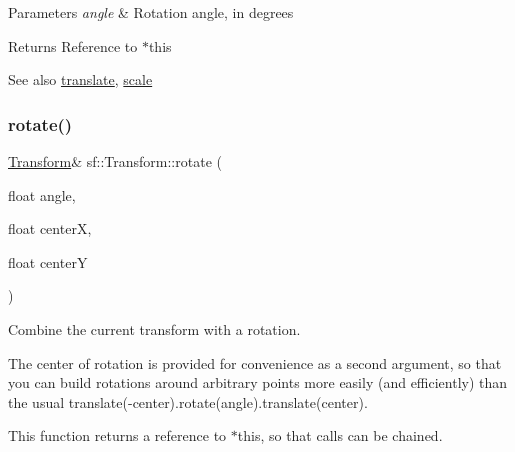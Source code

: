 \begin{DoxyParams}{Parameters}
{\em angle} & Rotation angle, in degrees\\
\hline
\end{DoxyParams}
\begin{DoxyReturn}{Returns}
Reference to $\ast$this
\end{DoxyReturn}
\begin{DoxySeeAlso}{See also}
\mbox{\hyperlink{classsf_1_1_transform_ab54f6c8070cc05e2afcb3145fbf4395a}{translate}}, \mbox{\hyperlink{classsf_1_1_transform_a3f46af807f69d74120fb836334268671}{scale}} \begin{DoxyVerb}\end{DoxyVerb}
 
\end{DoxySeeAlso}
\mbox{\label{classsf_1_1_transform_af0b7cc3fed36d0fa22d5d331a779eee2}} 
\subsubsection{\texorpdfstring{rotate()}{rotate()}\hspace{0.1cm}{\footnotesize\ttfamily [2/3]}}
{\footnotesize\ttfamily \mbox{\hyperlink{classsf_1_1_transform}{Transform}}\& sf\+::\+Transform\+::rotate (\begin{DoxyParamCaption}\item[{float}]{angle,  }\item[{float}]{centerX,  }\item[{float}]{centerY }\end{DoxyParamCaption})}



Combine the current transform with a rotation. 

The center of rotation is provided for convenience as a second argument, so that you can build rotations around arbitrary points more easily (and efficiently) than the usual translate(-\/center).rotate(angle).translate(center).

This function returns a reference to $\ast$this, so that calls can be chained. 
\begin{DoxyCode}{0}
\end{DoxyCode}



